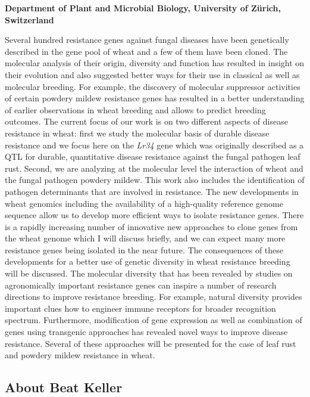 \documentclass[12pt,]{book}
\theoremstyle{definition}
\theoremstyle{definition}
\theoremstyle{remark}
\begin{document}
\textbf{Department of Plant and Microbial Biology, University of Zürich,
Switzerland}

Several hundred resistance genes against fungal diseases have been
genetically described in the gene pool of wheat and a few of them have
been cloned. The molecular analysis of their origin, diversity and
function has resulted in insight on their evolution and also suggested
better ways for their use in classical as well as molecular breeding.
For example, the discovery of molecular suppressor activities of certain
powdery mildew resistance genes has resulted in a better understanding
of earlier observations in wheat breeding and allows to predict breeding
outcomes. The current focus of our work is on two different aspects of
disease resistance in wheat: first we study the molecular basis of
durable disease resistance and we focus here on the \emph{Lr34} gene
which was originally described as a QTL for durable, quantitative
disease resistance against the fungal pathogen leaf rust. Second, we are
analyzing at the molecular level the interaction of wheat and the fungal
pathogen powdery mildew. This work also includes the identification of
pathogen determinants that are involved in resistance. The new
developments in wheat genomics including the availability of a
high-quality reference genome sequence allow us to develop more
efficient ways to isolate resistance genes. There is a rapidly
increasing number of innovative new approaches to clone genes from the
wheat genome which I will discuss briefly, and we can expect many more
resistance genes being isolated in the near future. The consequences of
these developments for a better use of genetic diversity in wheat
resistance breeding will be discussed. The molecular diversity that has
been revealed by studies on agronomically important resistance genes can
inspire a number of research directions to improve resistance breeding.
For example, natural diversity provides important clues how to engineer
immune receptors for broader recognition spectrum. Furthermore,
modification of gene expression as well as combination of genes using
transgenic approaches has revealed novel ways to improve disease
resistance. Several of these approaches will be presented for the case
of leaf rust and powdery mildew resistance in wheat.

\subsection*{About Beat Keller}\label{about-beat-keller}
\end{document}
